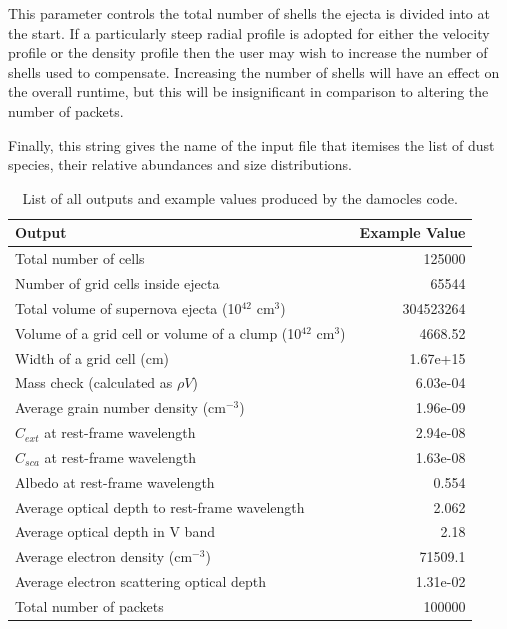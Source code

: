 
 This parameter controls the total number of shells the ejecta is divided into at the start.  If a particularly steep radial profile is adopted for either the velocity profile or the density profile then the user may wish to increase the number of shells used to compensate.  Increasing the number of shells will have an effect on the overall runtime, but this will be insignificant in comparison to altering the number of packets.  


 Finally, this string gives the name of the input file that itemises the list of dust species, their relative abundances and size distributions.

 \begin{table}
 \caption{List of all outputs and example values produced by the {\sc damocles} code.}
 \begin{center}
 \def\arraystretch{1.5}
 \begin{tabular}{ l  r}
 \toprule
 Output & Example Value \\
 \midrule
 Total number of cells      & 125000 \\
 Number of grid cells inside ejecta   & 65544 \\
 Total volume of supernova ejecta (10$^{42}$ cm$^3$)   & 304523264 \\
 Volume of a grid cell or volume of a clump (10$^{42}$ cm$^3$)   & 4668.52\\
 Width of a grid cell (cm) &   1.67e+15\\
 \midrule
 Mass check (calculated as $\rho V$)   & 6.03e-04 \\
 \midrule
 Average grain number density (cm$^{-3}$)  & 1.96e-09\\
 $C_{ext}$ at rest-frame wavelength  & 2.94e-08 \\
 $C_{sca}$ at rest-frame wavelength  & 1.63e-08 \\
 Albedo at rest-frame wavelength & 0.554 \\
 Average optical depth to rest-frame wavelength  & 2.062 \\
 Average optical depth in V band  & 2.18 \\
 \midrule
 Average electron density (cm$^{-3}$) & 71509.1 \\
 Average electron scattering optical depth &   1.31e-02\\
 \midrule
 Total number of packets      &          100000\\

\end{tabular}
\end{center}
\end{table}
